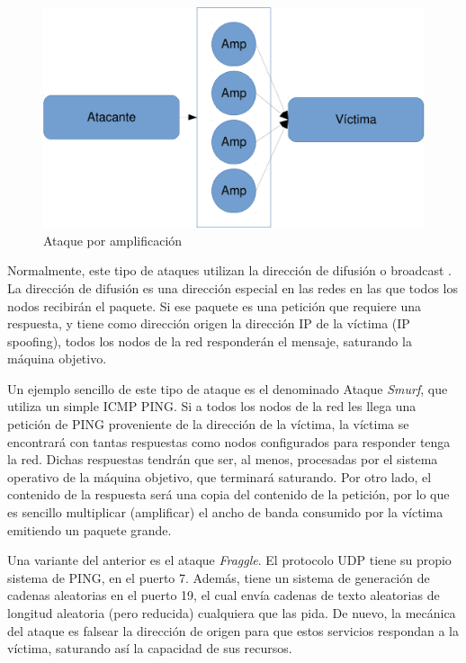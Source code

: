 \begin{figure}[htbp]
\centering
\includegraphics[width=.8\textwidth]{CapituloDDoS/Figuras/Amplificacion}
\caption{Ataque por amplificación}
\end{figure}
%

Normalmente, este tipo de ataques utilizan la dirección de difusión o broadcast . La 
dirección de difusión es una dirección especial en las redes en las que todos los nodos recibirán el paquete. Si ese 
paquete es una petición que requiere una respuesta, y tiene como dirección origen la dirección IP 
de la víctima (IP spoofing), todos los nodos de la red responderán el mensaje, saturando la máquina 
objetivo.

Un ejemplo sencillo de este tipo de ataque es el denominado Ataque \emph{Smurf}, que utiliza un 
simple \gls{ICMP} PING. Si a todos los nodos de la red les llega una petición de PING 
proveniente de la dirección de la víctima, la víctima se encontrará con tantas respuestas como nodos configurados para 
responder tenga la red. Dichas respuestas tendrán que ser, al menos, procesadas por el sistema operativo de la máquina 
objetivo, que terminará saturando. Por otro lado, el contenido de la respuesta será una copia del contenido de la 
petición, por lo que es sencillo multiplicar (amplificar) el ancho de banda consumido por la víctima emitiendo un 
paquete grande.

Una variante del anterior es el ataque \emph{Fraggle}. El protocolo \gls{UDP} tiene su propio sistema de PING, en 
el puerto 7. Además, tiene un sistema de generación de cadenas aleatorias en el puerto 19, el cual envía cadenas de 
texto aleatorias de longitud aleatoria (pero reducida) cualquiera que las pida. De nuevo, la mecánica del ataque es 
falsear la dirección de origen para que estos servicios respondan a la víctima, saturando así la capacidad de sus 
recursos.

